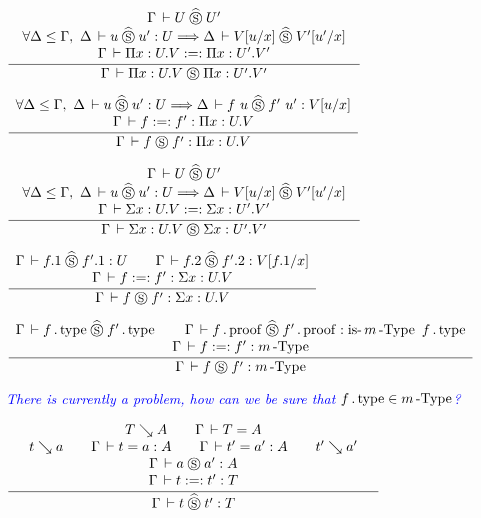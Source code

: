 \documentclass[a4paper,english]{lipics-utf8x}
\newcommand\meta[1]{\noindent\textcolor{blue}{\emph{#1}}}
\begin{document}
  \begin{center}
  \(
    \tru{\Gamma \der U \hSr U'
       }{\forall \Delta \le \Gamma,\ \Delta \der u \hSr u' : U \gives
         \Delta \der V[u/x] \hSr V'[u'/x]
       }{\Gamma \der \Pi x:U.V :=: \Pi x:U'.V'
       }{\Gamma \der \Pi x:U.V \Sr \Pi x:U'.V'}
  \)
  \end{center}

  \begin{center}
  \(
    \dru{\forall \Delta \le \Gamma,\ \Delta \der u \hSr u' : U \gives
         \Delta \der f~u \hSr f'~u' : V[u/x]
       }{\Gamma \der f :=: f' : \Pi x:U.V
       }{\Gamma \der f \Sr f' : \Pi x:U.V}
  \)
  \end{center}

  \begin{center}
  \(
    \tru{\Gamma \der U \hSr U'
       }{\forall \Delta \le \Gamma,\ \Delta \der u \hSr u' : U \gives
         \Delta \der V[u/x] \hSr V'[u'/x]
       }{\Gamma \der \Sigma x:U.V :=: \Sigma x:U'.V'
       }{\Gamma \der \Sigma x:U.V \Sr \Sigma x:U'.V'}
  \)
  \end{center}

  \begin{center}
  \(
    \dru{\Gamma \der f.1 \hSr f'.1 : U \qquad
         \Gamma \der f.2 \hSr f'.2 : V[f.1/x]
       }{\Gamma \der f :=: f' : \Sigma x:U.V
       }{\Gamma \der f \Sr f' : \Sigma x:U.V}
  \)
  \end{center}

  \begin{center}
  \(
    \dru{\Gamma \der f \gettype \hSr f' \gettype \qquad
         \Gamma \der f \getproof \hSr f' \getproof : \isnType{m}{f \gettype}
       }{\Gamma \der f :=: f' : \nType{m}
       }{\Gamma \der f \Sr f' : \nType{m}}
  \)
  \end{center}

  \meta{There is currently a problem, how can we be sure that
  $f \operatorname{.type} \in m\operatorname{-Type}$?}

  \begin{center}
  \(
    \qru{T \rew A \qquad
         \Gamma \der T = A
       }{t \rew a \qquad
         \Gamma \der t = a : A \qquad
         \Gamma \der t' = a' : A \qquad
         t' \rew a'
       }{\Gamma \der a \Sr a' : A
       }{\Gamma \der t :=: t' : T
       }{\Gamma \der t \hSr t' : T}
  \)
  \end{center}
\end{document}
